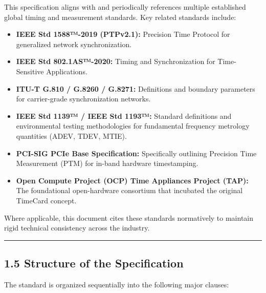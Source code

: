 \documentclass[
]{article}
\begin{document}
This specification aligns with and periodically references multiple
established global timing and measurement standards. Key related
standards include:

\begin{itemize}
\item
  \textbf{IEEE Std 1588™-2019 (PTPv2.1):} Precision Time Protocol for
  generalized network synchronization.
\item
  \textbf{IEEE Std 802.1AS™-2020:} Timing and Synchronization for
  Time-Sensitive Applications.
\item
  \textbf{ITU-T G.810 / G.8260 / G.8271:} Definitions and boundary
  parameters for carrier-grade synchronization networks.
\item
  \textbf{IEEE Std 1139™ / IEEE Std 1193™:} Standard definitions and
  environmental testing methodologies for fundamental frequency
  metrology quantities (ADEV, TDEV, MTIE).
\item
  \textbf{PCI-SIG PCIe Base Specification:} Specifically outlining
  Precision Time Measurement (PTM) for in-band hardware timestamping.
\item
  \textbf{Open Compute Project (OCP) Time Appliances Project (TAP):} The
  foundational open-hardware consortium that incubated the original
  TimeCard concept.
\end{itemize}

Where applicable, this document cites these standards normatively to
maintain rigid technical consistency across the industry.

\begin{center}\rule{0.5\linewidth}{0.5pt}\end{center}

\subsection{1.5 Structure of the
Specification}\label{structure-of-the-specification}

The standard is organized sequentially into the following major clauses:
\end{document}
